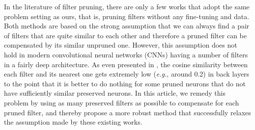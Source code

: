  In the literature of filter pruning, there are only a few works \cite{NM, Data-free,RedPlus} that adopt the same problem setting as ours, that is, pruning filters without any fine-tuning and data.  Both methods are based on the strong assumption that we can always find a pair of filters that are quite similar to each other and therefore a pruned filter can be compensated by its similar unpruned one. However, this assumption does not hold in modern convolutional neural networks (CNNs) having a number of filters in a fairly deep architecture. As even presented in \cite{NM}, the cosine similarity between each filter and its nearest one gets extremely low (\textit{e.g.}, around 0.2) in back layers to the point that it is better to do nothing for some pruned neurons that do not have sufficiently similar preserved neurons. In this article, we remedy this problem by using as many preserved filters as possible to compensate for each pruned filter, and thereby propose a more robust method that successfully relaxes the assumption made by these existing works. 







